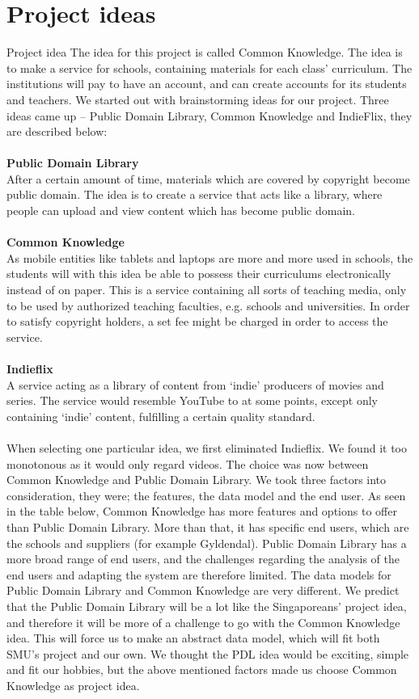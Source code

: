 \documentclass[10pt,a4paper]{article}
\begin{document}
\section{Project ideas}
Project idea 
The idea for this project is called Common Knowledge. The idea is to make a service for schools, containing materials for each class’ curriculum. The institutions will pay to have an account, and can create accounts for its students and teachers.
We started out with brainstorming ideas for our project. Three ideas came up – Public Domain Library, Common Knowledge and IndieFlix, they are described below:\\\\
{\bfseries Public Domain Library}\\
After a certain amount of time, materials which are covered by copyright become public domain. The idea is to create a service that acts like a library, where people can upload and view content which has become public domain.\\\\
{\bfseries Common Knowledge}\\
As mobile entities like tablets and laptops are more and more used in schools, the students will with this idea be able to possess their curriculums electronically instead of on paper. This is a service containing all sorts of teaching media, only to be used by authorized teaching faculties, e.g. schools and universities. In order to satisfy copyright holders, a set fee might be charged in order to access the service.\\\\
{\bfseries Indieflix}\\
A service acting as a library of content from ‘indie’ producers of movies and series. The service would resemble YouTube to at some points, except only containing ‘indie’ content, fulfilling a certain quality standard.\\\\
When selecting one particular idea, we first eliminated Indieflix. We found it too monotonous as it would only regard videos. The choice was now between Common Knowledge and Public Domain Library.  We took three factors into consideration, they were; the features, the data model and the end user. As seen in the table below, Common Knowledge has more features and options to offer than Public Domain Library. More than that, it has specific end users, which are the schools and suppliers (for example Gyldendal). Public Domain Library has a more broad range of end users, and the challenges regarding the analysis of the end users and adapting the system are therefore limited. The data models for Public Domain Library and Common Knowledge are very different. We predict that the Public Domain Library will be a lot like the Singaporeans’ project idea, and therefore it will be more of a challenge to go with the Common Knowledge idea. This will force us to make an abstract data model, which will fit both SMU’s project and our own. We thought the PDL idea would be exciting, simple and fit our hobbies, but the above mentioned factors made us choose Common Knowledge as project idea.\\
\end{document}
